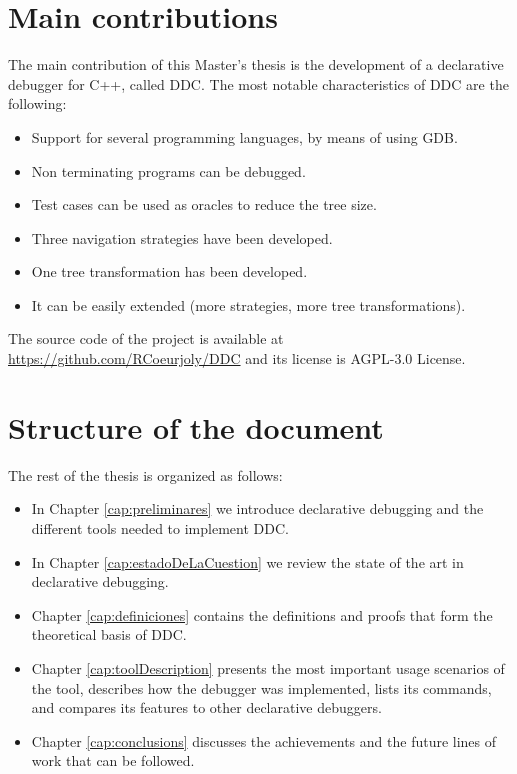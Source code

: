 \section{Main contributions}

The main contribution of this Master's thesis is the development of a declarative debugger for C++, called DDC.
%
The most notable characteristics of DDC are the following:
\begin{itemize}
\item Support for several programming languages, by means of using GDB.
\item Non terminating programs can be debugged.
\item Test cases can be used as oracles to reduce the tree size.
\item Three navigation strategies have been developed.
\item One tree transformation has been developed.
\item It can be easily extended (more strategies, more tree transformations).
\end{itemize}

The source code of the project is available at \url{https://github.com/RCoeurjoly/DDC} 
and its license is AGPL-3.0 License.

\section{Structure of the document}
The rest of the thesis is organized as follows:
\begin{itemize}
    \item In Chapter \ref{cap:preliminares} we introduce declarative debugging and the different tools needed to implement DDC.
    \item  In Chapter \ref{cap:estadoDeLaCuestion} we review the state of the art in declarative debugging. 
    \item Chapter \ref{cap:definiciones} contains the definitions and proofs that form the theoretical basis of DDC. 
    \item Chapter \ref{cap:toolDescription} presents the most important usage scenarios of the tool, describes how the debugger was implemented, lists its commands, and compares its features to other declarative debuggers. 
    \item Chapter \ref{cap:conclusions} discusses the achievements and the future lines of work that can be followed.
\end{itemize}
